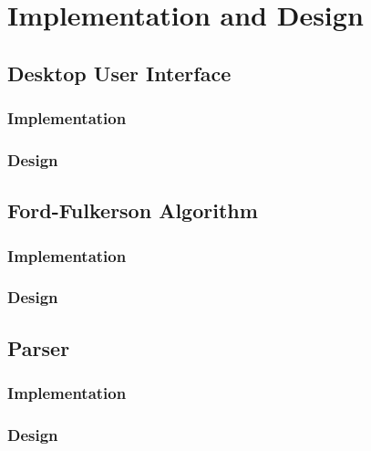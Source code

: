 \documentclass{l3proj}
\begin{document}
\chapter{Implementation and Design}
\label{design}

\section{Desktop User Interface}

\subsection{Implementation}

\subsection{Design}

\section{Ford-Fulkerson Algorithm}

\subsection{Implementation}

\subsection{Design}

\section{Parser}

\subsection{Implementation}

\subsection{Design}
\end{document}
